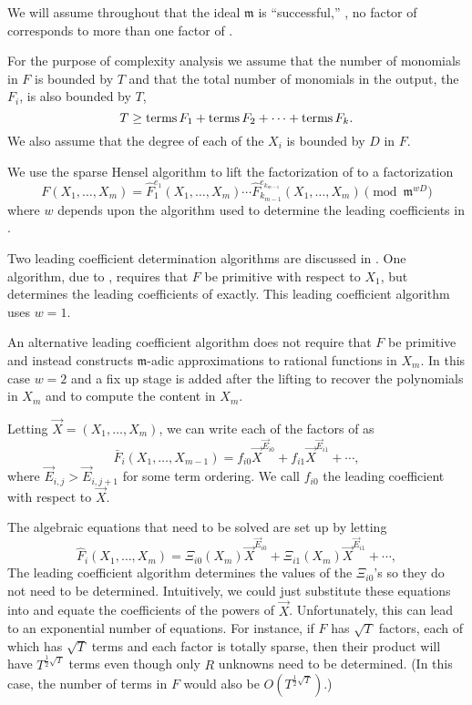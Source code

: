 We will assume throughout that the ideal $\mathfrak{m}$ is
``successful,'' \ie, no factor of 
corresponds to more than one factor of .

For the purpose of complexity analysis we assume that the number
of monomials in $F$ is bounded by $T$ and that the total number of
monomials in the output, the $F_i$, is also bounded by $T$,
\[
T \ge \operatorname{terms} F_1 + \operatorname{terms} F_2 + \cdots + \operatorname{terms} F_k.
\]
We also assume that the degree of each of the $X_i$ is bounded by $D$
in $F$. 

We use the sparse Hensel algorithm to lift the factorization of
 to a factorization
\begin{equation} \label{GF:HenselFact:Eq}
F(X_1, \ldots, X_m) = \hat{F}_1^{e_1}(X_1, \ldots, X_{m}) \cdots
   \hat{F}_{k_{m-1}}^{e_{k_{m-1}}}(X_1, \ldots, X_{m}) 
\pmod{\mathfrak{m}^{wD}}
\end{equation}
where $w$ depends upon the algorithm used to determine the leading
coefficients in .  

Two leading coefficient determination algorithms are discussed in
.  One algorithm, due to {\WangP} \cite{Wang1978-iu},
requires that $F$ be primitive with respect to $X_1$, but determines
the leading coefficients of  exactly.  This
leading coefficient algorithm uses $w = 1$.

An alternative leading coefficient algorithm does not require that $F$
be primitive and instead constructs $\mathfrak{m}$-adic approximations to
rational functions in $X_m$.  In this case $w = 2$ and a fix up stage
is added after the lifting to recover the polynomials in $X_m$ and to
compute the content in $X_m$.

Letting $\vec{X} = (X_1, \ldots, X_m)$, we can write each of the
factors of  as
\[
\bar{F}_i(X_1, \ldots, X_{m-1}) = f_{i0} \vec{X}^{\vec{E}_{i0}} + 
f_{i1} \vec{X}^{\vec{E}_{i1}} + \cdots,
\]
where  $\vec{E}_{i,j} > \vec{E}_{i,j+1}$ for some term
ordering.  We call $f_{i0}$ the leading coefficient with respect
to $\vec{X}$.

The algebraic equations that need to be solved are set up by letting 
\begin{equation} \label{GF:mFactor:Eq}
\hat{F}_i(X_1, \ldots,  X_{m}) = 
\Xi_{i0}(X_{m}) \vec{X}^{\vec{E}_{i0}} + 
\Xi_{i1}(X_{m}) \vec{X}^{\vec{E}_{i1}} + \cdots,
\end{equation}
The leading coefficient algorithm determines the values of the
$\Xi_{i0}$'s so they do not need to be determined.  Intuitively, we
could just substitute these equations into
 and equate the coefficients of the powers of
$\vec{X}$.  Unfortunately, this can lead to an exponential number of
equations.  For instance, if $F$ has $\sqrt{T}$ factors, each of which
has $\sqrt{T}$ terms and each factor is totally sparse, then their
product will have $T^{\frac{1}{2}\sqrt{T}}$
terms even though only $R$ unknowns need to be determined.  (In this
case, the number of terms in $F$ would also be
$O(T^{\frac{1}{2}\sqrt{T}})$.)

